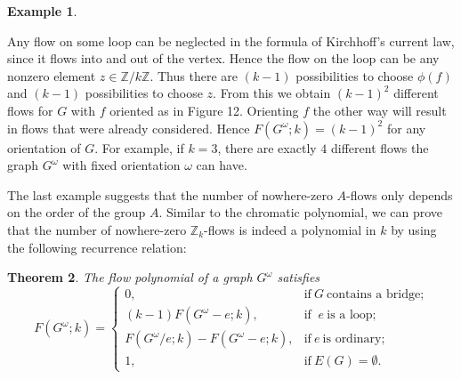 \documentclass[12pt,a4paper, twoside, autooneside=false]{scrartcl}
\newtheorem{theorem}{Theorem}[section]
\theoremstyle{definition}
\newtheorem{beispiel}[theorem]{Example}
\theoremstyle{remark}
\numberwithin{equation}{section}
\begin{document}
\begin{beispiel}
\begin{center}
\label{fig:label}
\end{center} 
Any flow on some loop can be neglected in the formula of Kirchhoff's current law, since it flows into and out of the vertex. Hence the flow on the loop can be any nonzero element $z \in \mathbb{Z}/k\mathbb{Z}$. Thus there are $(k - 1)$ possibilities to choose $\phi(f)$ and $(k - 1)$ possibilities to choose $z$. From this we obtain $(k - 1)^2$ different flows for $G$ with $f$ oriented as in Figure 12. Orienting $f$ the other way will result in flows that were already considered. Hence $F(G^\omega; k) = (k - 1)^2$ for any orientation of $G$. For example, if $k = 3$, there are exactly $4$ different flows the graph $G^\omega$ with fixed orientation $\omega$ can have. 
\end{beispiel}
The last example suggests that the number of nowhere-zero $A$-flows only depends on the order of the group $A$. Similar to the chromatic polynomial, we can prove that the number of nowhere-zero $\mathbb{Z}_k$-flows is indeed a polynomial in $k$ by using the following recurrence relation: 
\begin{theorem}
The flow polynomial of a graph $G^\omega$ satisfies 
\[
F(G^\omega;k) = \begin{cases}
0, & \text{if} \ G \ \text{contains a bridge;} \\
(k - 1)F(G^\omega - e; k), & \text{if } \ e \ \text{is a loop;} \\
F(G^\omega / e;k) - F(G^\omega - e;k), & \text{if} \ e \ \text{is ordinary;} \\
1, & \text{if} \ E(G) = \emptyset.
\end{cases}
\]
\end{theorem}
\end{document}
